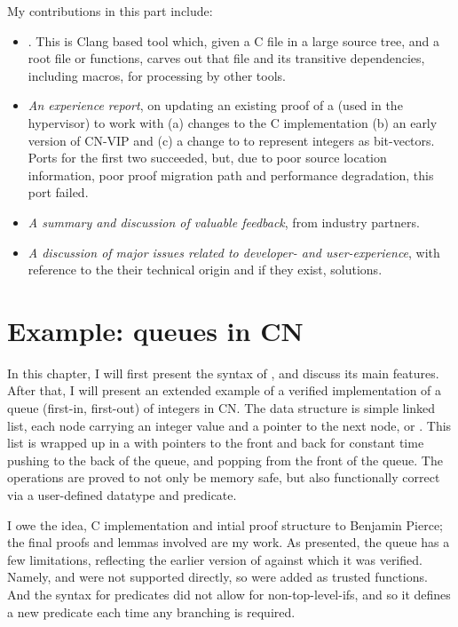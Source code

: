 My contributions in this part include:
\begin{itemize}
    \item {}. This is Clang based tool
        which, given a C file in a large source tree, and a root file or
        functions, carves out that file and its transitive dependencies,
        including macros, for processing by other tools.
    \item \emph{An experience report}, on updating an existing proof of a  (used in the  hypervisor) to work with (a)
        changes to the C implementation (b) an early version of CN-VIP and (c)
        a change to  to represent integers as bit-vectors. Ports
        for the first two succeeded, but, due to poor source location
        information, poor proof migration path and performance degradation,
        this port failed.
    \item \emph{A summary and discussion of valuable feedback}, from industry
        partners.
    \item \emph{A discussion of major issues related to developer- and
        user-experience}, with reference to the their technical origin and if
        they exist, solutions.
\end{itemize}

\chapter{Example: queues in CN}

\margintoc{}

In this chapter, I will first present the syntax of , and discuss its
main features. After that, I will  present an extended example of a verified
implementation of a queue (first-in, first-out) of integers in CN\@. The data
structure is simple linked list, each node carrying an integer value and a
pointer to the next node, or . This list is wrapped up in a
 with pointers to the front and back for constant time pushing
to the back of the queue, and popping from the front of the queue. The
operations are proved to not only be memory safe, but also functionally correct
via a user-defined datatype and predicate.

I owe the idea, C implementation and intial proof structure to Benjamin Pierce;
the final proofs and lemmas involved are my work. As presented, the queue has a
few limitations, reflecting the earlier version of  against which it was
verified. Namely,  and  were not supported
directly, so were added as trusted functions. And the syntax for predicates did
not allow for non-top-level-ifs, and so it defines a new predicate each time
any branching is required.

